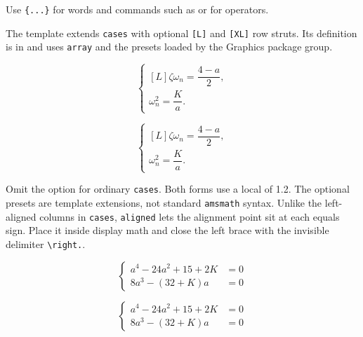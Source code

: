 Use \texttt{\string\text\{...\}} for words and commands such as
\texttt{\string\sin} or \texttt{\string\log} for operators.

The template extends \texttt{cases} with optional \texttt{[L]} and
\texttt{[XL]} row struts. Its definition is in
 and uses \texttt{array}
and the presets loaded by the Graphics package group.
\begin{referencecode}
\[
\begin{cases}[L]
    \zeta\omega_n = \dfrac{4-a}{2}, \\
    \omega_n^2 = \dfrac{K}{a}.
\end{cases}
\]
\end{referencecode}

\[
\begin{cases}[L]
    \zeta\omega_n = \dfrac{4-a}{2}, \\
    \omega_n^2 = \dfrac{K}{a}.
\end{cases}
\]

Omit the option for ordinary \texttt{cases}. Both forms use a local
\texttt{\string\arraystretch} of 1.2. The optional presets are
template extensions, not standard \texttt{amsmath} syntax.
Unlike the left-aligned columns in \texttt{cases}, \texttt{aligned}
lets the alignment point sit at each equals sign. Place it inside
display math and close the left brace with the invisible delimiter
\verb|\right.|.
\begin{referencecode}
\[
\left\{
\begin{aligned}
    a^4 - 24a^2 + 15 + 2K &= 0 \\
    8a^3 - (32+K)a &= 0
\end{aligned}
\right.
\]
\end{referencecode}

\[
\left\{
\begin{aligned}
    a^4 - 24a^2 + 15 + 2K &= 0 \\
    8a^3 - (32+K)a &= 0
\end{aligned}
\right.
\]
